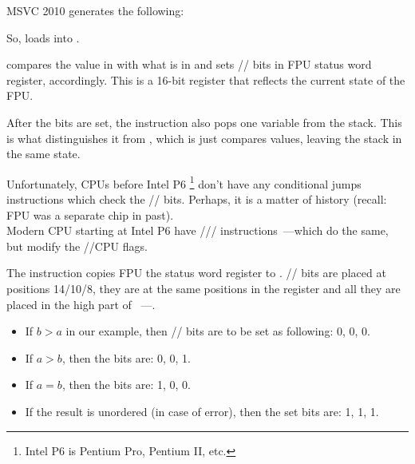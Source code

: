 
MSVC 2010 generates the following:




So, \FLD loads  into .

\label{Czero_etc}
\newcommand{\Czero}{\GTT{C0}\xspace}
\newcommand{\Ctwo}{\GTT{C2}\xspace}
\newcommand{\Cthree}{\GTT{C3}\xspace}
\newcommand{\CThreeBits}{\Cthree/\Ctwo/\Czero}


\FCOMP compares the value in  with what is in  
and sets \CThreeBits bits in FPU status word register, accordingly. 
This is a 16-bit register that reflects the current state of the FPU.

After the bits are set, the \FCOMP instruction also pops one variable from the stack. 
This is what distinguishes it from \FCOM, which is just compares values, leaving the stack in the same state.

Unfortunately, CPUs before Intel P6
\footnote{Intel P6 is Pentium Pro, Pentium II, etc.} don't have any conditional 
jumps instructions which check the \CThreeBits bits. 
Perhaps, it is a matter of history (recall: FPU was a separate chip in past).\\
Modern CPU starting at Intel P6 have \FCOMI/\FCOMIP/\FUCOMI/\FUCOMIP 
instructions~---which do the same, but modify the \ZF/\PF/\CF CPU flags.


The \FNSTSW instruction copies FPU the status word register to \AX. 
\CThreeBits bits are placed at positions 14/10/8, 
they are at the same positions in the \AX register and all they are placed in the high part of \AX{}~---\AH{}.

\begin{itemize}
\item If $b>a$ in our example, then \CThreeBits bits are to be set as following: 0, 0, 0.
\item If $a>b$, then the bits are: 0, 0, 1.
\item If $a=b$, then the bits are: 1, 0, 0.
\item

If the result is unordered (in case of error), then the set bits are: 1, 1, 1.
\end{itemize}

